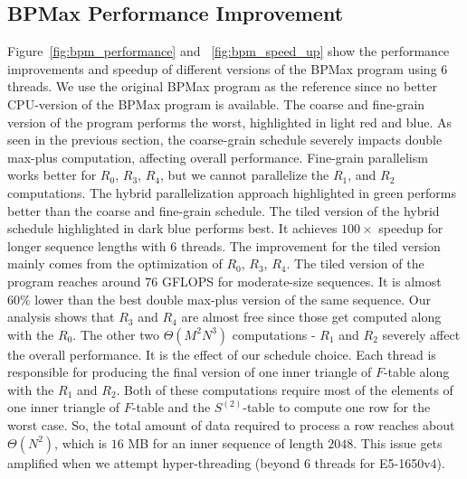 \subsection{BPMax  Performance Improvement}
Figure~\ref{fig:bpm_performance} and ~\ref{fig:bpm_speed_up} show the performance improvements and speedup  of different versions of the BPMax program using $6$ threads. We use the original BPMax program as the reference since no better CPU-version of the BPMax program is available. The coarse and fine-grain version of the program performs the worst, highlighted in light red and blue. As seen in the previous section, the coarse-grain schedule severely impacts double max-plus computation, affecting overall performance. Fine-grain parallelism works better for $R_0$, $R_3$, $R_4$, but we cannot parallelize the $R_1$, and $R_2$ computations. The hybrid parallelization approach highlighted in green performs better than the coarse and fine-grain schedule. The tiled version of the hybrid schedule highlighted in dark blue performs best. It achieves $100\times$ speedup for longer sequence lengths with $6$ threads. The improvement for the tiled version mainly comes from the optimization of $R_0$, $R_3$, $R_4$. The tiled version of the program reaches around $76$ GFLOPS for moderate-size sequences. It is almost $60\%$ lower than the best double max-plus version of the same sequence. Our analysis shows that $R_3$ and $R_4$ are almost free since those get computed along with the $R_0$. The other two $\Theta(M^2N^3)$ computations - $R_{1}$ and $R_{2}$ severely affect the overall performance. It is the effect of our schedule choice. Each thread is responsible for producing the final version of one inner triangle of $F$-table along with the $R_{1}$ and $R_{2}$. Both of these computations require most of the elements of one inner triangle of $F$-table and the $S^{(2)}$-table to compute one row for the worst case. So, the total amount of data required to process a row reaches about $\Theta(N^2)$, which is $16$ MB for an inner sequence of length $2048$. This issue gets amplified when we attempt hyper-threading (beyond $6$ threads for E5-1650v4).  


